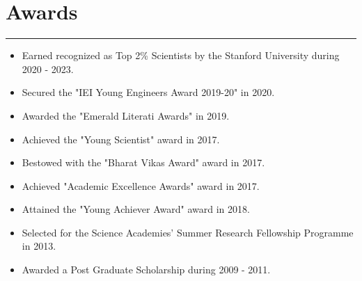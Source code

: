 \documentclass[10pt, a4paper]{article}
\begin{document}
	\section*{Awards}
	\vspace*{-2.5mm}
	\hrule 
	\vspace*{2mm}
	\begin{itemize}[leftmargin=*]
		\item Earned recognized as Top 2\% Scientists by the Stanford University during 2020 - 2023.
		\vspace*{-2mm}
		\item Secured the "IEI Young Engineers Award 2019-20" in 2020.
		\vspace*{-2mm}		
		\item Awarded the "Emerald Literati Awards" in 2019.
				\vspace*{-2mm}	
		\item Achieved the "Young Scientist" award in 2017.
				\vspace*{-2mm}	
		\item Bestowed with the "Bharat Vikas Award" award in 2017.
		\vspace*{-2mm}	
		\item Achieved "Academic Excellence Awards" award in 2017.
				\vspace*{-2mm}	
		\item Attained the "Young Achiever Award" award in 2018.
		
		\vspace*{-2mm}	
		\item Selected for the Science Academies’ Summer Research Fellowship Programme in 2013.	
		\vspace*{-2mm}	
		\item  Awarded a Post Graduate Scholarship during 2009 - 2011.	
		
	\end{itemize}
	
\end{document}
